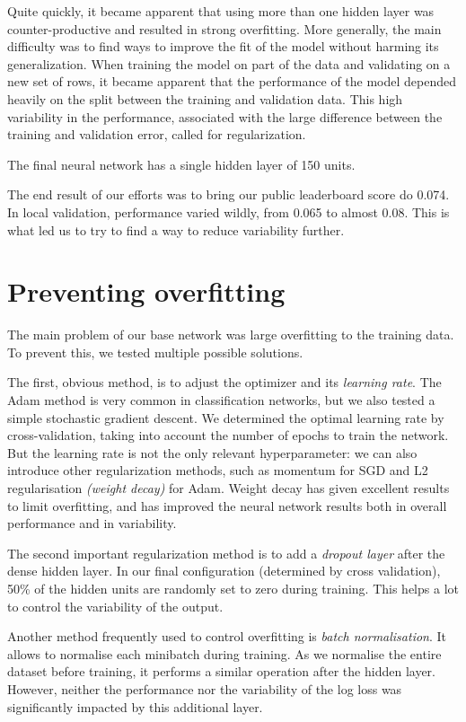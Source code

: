 \documentclass[a4paper,11pt,openany,extrafontsizes,oneside,article,twocolumn]{memoir}
\begin{document}
Quite quickly, it became apparent that using more than one hidden
layer was counter-productive and resulted in strong overfitting. More
generally, the main difficulty was to find ways to improve the fit of
the model without harming its generalization. When training the model
on part of the data and validating on a new set of rows, it became
apparent that the performance of the model depended heavily on the
split between the training and validation data. This high variability
in the performance, associated with the large difference between the
training and validation error, called for regularization.

The final neural network has a single hidden layer of 150 units.

The end result of our efforts was to bring our public leaderboard
score do 0.074. In local validation, performance varied wildly, from
0.065 to almost 0.08. This is what led us to try to find a way to
reduce variability further.

\section{Preventing overfitting}

The main problem of our base network was large overfitting to the
training data. To prevent this, we tested multiple possible solutions.

The first, obvious method, is to adjust the optimizer and its
\emph{learning rate}. The Adam method is very common in classification
networks, but we also tested a simple stochastic gradient descent. We
determined the optimal learning rate by cross-validation, taking into
account the number of epochs to train the network. But the learning
rate is not the only relevant hyperparameter: we can also introduce
other regularization methods, such as momentum for SGD and L2
regularisation \emph{(weight decay)} for Adam. Weight decay has given
excellent results to limit overfitting, and has improved the neural
network results both in overall performance and in variability.

The second important regularization method is to add a \emph{dropout
  layer} after the dense hidden layer. In our final configuration
(determined by cross validation), 50\% of the hidden units are
randomly set to zero during training. This helps a lot to control the
variability of the output.

Another method frequently used to control overfitting is \emph{batch
  normalisation}. It allows to normalise each minibatch during
training. As we normalise the entire dataset before training, it
performs a similar operation after the hidden layer. However, neither
the performance nor the variability of the log loss was significantly
impacted by this additional layer.
\end{document}
